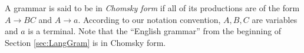 

\setcounter{section}{5}
\setcounter{subsection}{2}
\setcounter{dfn}{5}

A grammar is said to be in \emph{Chomsky form} if all of its productions are of the form $A \to BC$ and $A \to a$.
According to our notation convention, $A, B, C$ are variables and $a$ is a terminal.
Note that the ``English grammar'' from the beginning of Section \ref{sec:LangGram} is in Chomsky form.



